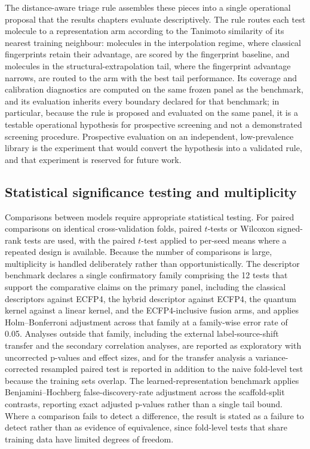 The distance-aware triage rule assembles these pieces into a single operational proposal that the results chapters evaluate descriptively. The rule routes each test molecule to a representation arm according to the Tanimoto similarity of its nearest training neighbour: molecules in the interpolation regime, where classical fingerprints retain their advantage, are scored by the fingerprint baseline, and molecules in the structural-extrapolation tail, where the fingerprint advantage narrows, are routed to the arm with the best tail performance. Its coverage and calibration diagnostics are computed on the same frozen panel as the benchmark, and its evaluation inherits every boundary declared for that benchmark; in particular, because the rule is proposed and evaluated on the same panel, it is a testable operational hypothesis for prospective screening and not a demonstrated screening procedure. Prospective evaluation on an independent, low-prevalence library is the experiment that would convert the hypothesis into a validated rule, and that experiment is reserved for future work.

\subsection{Statistical significance testing and multiplicity}

Comparisons between models require appropriate statistical testing. For paired comparisons on identical cross-validation folds, paired $t$-tests or Wilcoxon signed-rank tests are used, with the paired $t$-test applied to per-seed means where a repeated design is available. Because the number of comparisons is large, multiplicity is handled deliberately rather than opportunistically. The descriptor benchmark declares a single confirmatory family comprising the \num{12} tests that support the comparative claims on the primary panel, including the classical descriptors against ECFP4, the hybrid descriptor against ECFP4, the quantum kernel against a linear kernel, and the ECFP4-inclusive fusion arms, and applies Holm--Bonferroni adjustment across that family at a family-wise error rate of \num{0.05}. Analyses outside that family, including the external label-source-shift transfer and the secondary correlation analyses, are reported as exploratory with uncorrected p-values and effect sizes, and for the transfer analysis a variance-corrected resampled paired test is reported in addition to the naive fold-level test because the training sets overlap. The learned-representation benchmark applies Benjamini--Hochberg false-discovery-rate adjustment across the scaffold-split contrasts, reporting exact adjusted p-values rather than a single tail bound. Where a comparison fails to detect a difference, the result is stated as a failure to detect rather than as evidence of equivalence, since fold-level tests that share training data have limited degrees of freedom.


